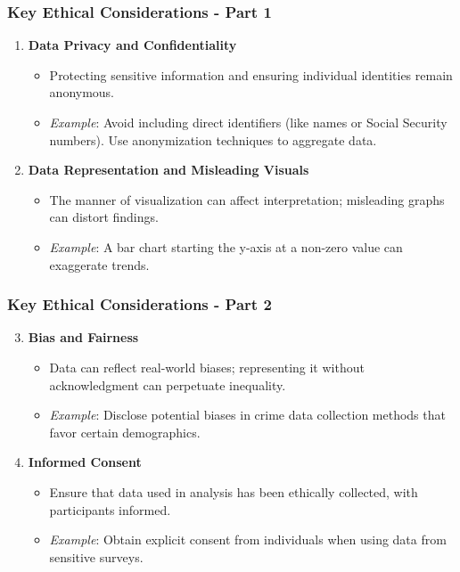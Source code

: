 \documentclass[aspectratio=169]{beamer}
\begin{document}
\begin{frame}[fragile]
    \frametitle{Key Ethical Considerations - Part 1}
    \begin{enumerate}
        \item \textbf{Data Privacy and Confidentiality}
        \begin{itemize}
            \item Protecting sensitive information and ensuring individual identities remain anonymous.
            \item \textit{Example}: Avoid including direct identifiers (like names or Social Security numbers). Use anonymization techniques to aggregate data.
        \end{itemize}

        \item \textbf{Data Representation and Misleading Visuals}
        \begin{itemize}
            \item The manner of visualization can affect interpretation; misleading graphs can distort findings.
            \item \textit{Example}: A bar chart starting the y-axis at a non-zero value can exaggerate trends.
        \end{itemize}
    \end{enumerate}
\end{frame}

\begin{frame}[fragile]
    \frametitle{Key Ethical Considerations - Part 2}
    \begin{enumerate}
        \setcounter{enumi}{2}
        \item \textbf{Bias and Fairness}
        \begin{itemize}
            \item Data can reflect real-world biases; representing it without acknowledgment can perpetuate inequality.
            \item \textit{Example}: Disclose potential biases in crime data collection methods that favor certain demographics.
        \end{itemize}

        \item \textbf{Informed Consent}
        \begin{itemize}
            \item Ensure that data used in analysis has been ethically collected, with participants informed.
            \item \textit{Example}: Obtain explicit consent from individuals when using data from sensitive surveys.
        \end{itemize}
    \end{enumerate}
\end{frame}
\end{document}
